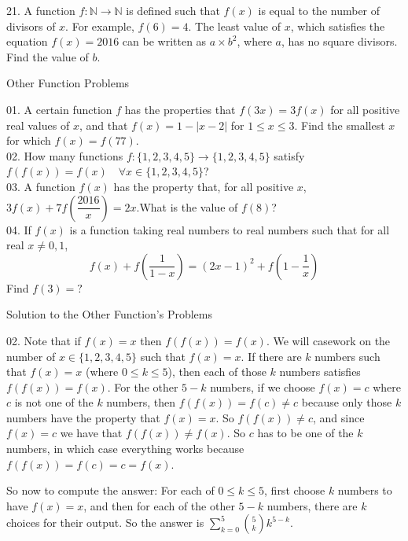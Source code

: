\documentclass[a4paper,11pt]{article}
\begin{document}
21. A function $f:\mathbb{N}\rightarrow \mathbb{N}$ is defined such that $f(x)$ is equal to the number of divisors of $x$. For example, $f(6) = 4$. The least value of $x$, which satisfies the equation $f(x)=2016$ can be written as $a\times b^{2}$, where $a$, has no square divisors. Find the value of $b$.

\begin{center}
\begin{LARGE}
Other Function Problems
\end{LARGE}
\end{center}

01. A certain function $f$ has the properties that $f(3x) = 3f(x)$ for all positive real values of $x$, and that $f(x) = 1-|x-2|$ for $1\le x \le 3$. Find the smallest $x$ for which $f(x) = f(77)$.\\

02. How many functions $f: \{1,2,3,4,5\} \rightarrow \{1,2,3,4,5\}$ satisfy $f(f(x))=f(x) \quad \forall x \in \{1, 2, 3, 4, 5\}$?\\

03. A function $f(x)$ has the property that, for all positive $x$, $3 f(x) + 7 f(\dfrac{2016}{x}) = 2x$.What is the value of $f(8)$?\\

04. If $f(x)$ is a function taking real numbers to real numbers such that for all real $x\neq0,1$, $$f(x)+f(\frac{1}{1-x})=(2x-1)^2+f(1-\frac{1}{x})$$Find $f(3)=?$
\clearpage

\begin{center}
\begin{LARGE}
Solution to the Other Function's Problems
\end{LARGE}
\end{center}

02.  Note that if $f(x)=x$ then $f(f(x)) = f(x)$. We will casework on the number of $x \in \{1,2,3,4,5 \}$ such that $f(x)=x$. If there are $k$ numbers such that $f(x)=x$ (where $0 \leq k \leq 5$), then each of those $k$ numbers satisfies $f(f(x)) = f(x)$. For the other $5-k$ numbers, if we choose $f(x) = c$ where $c$ is not one of the $k$ numbers, then $f(f(x)) = f(c) \neq c$ because only those $k$ numbers have the property that $f(x) = x$. So $f(f(x)) \neq c$, and since $f(x) = c$ we have that $f(f(x)) \neq f(x)$. So $c$ has to be one of the $k$ numbers, in which case everything works because  $f(f(x)) = f(c) = c = f(x)$.

So now to compute the answer: For each of $0 \leq k \leq 5$, first choose $k$ numbers to have $f(x) = x$, and then for each of the other $5-k$ numbers, there are $k$ choices for their output. So the answer is $\sum\limits_{k=0}^{5} \binom{5}{k} k^{5-k}$.\\
\end{document}

